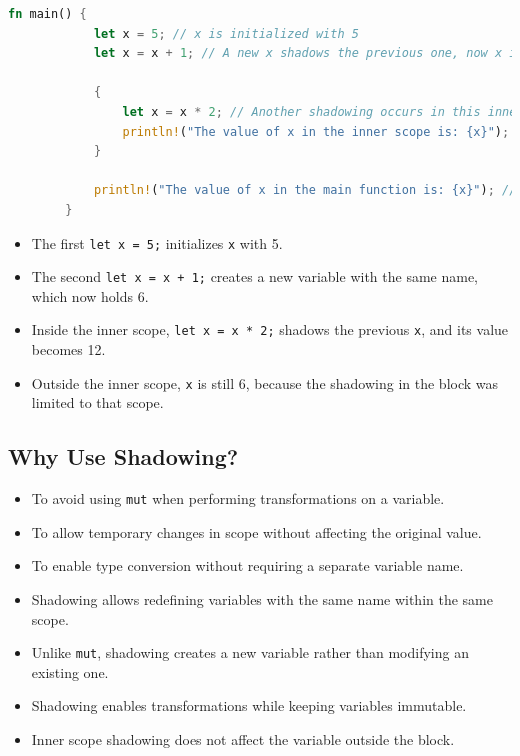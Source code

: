 \documentclass[a4paper,12pt]{report}
\begin{document}
	\begin{lstlisting}[language=Rust]
		fn main() {
			let x = 5; // x is initialized with 5
			let x = x + 1; // A new x shadows the previous one, now x is 6
			
			{
				let x = x * 2; // Another shadowing occurs in this inner scope, x is now 12
				println!("The value of x in the inner scope is: {x}");
			}
			
			println!("The value of x in the main function is: {x}"); // x remains 6
		}
	\end{lstlisting}
	

	\begin{explanationbox}
		\begin{itemize}
			\item The first \texttt{let x = 5;} initializes \texttt{x} with 5.
			\item The second \texttt{let x = x + 1;} creates a new variable with the same name, which now holds 6.
			\item Inside the inner scope, \texttt{let x = x * 2;} shadows the previous \texttt{x}, and its value becomes 12.
			\item Outside the inner scope, \texttt{x} is still 6, because the shadowing in the block was limited to that scope.
		\end{itemize}
	\end{explanationbox}
	
	
	\subsection*{Why Use Shadowing?}
	\begin{itemize}
		\item To avoid using \texttt{mut} when performing transformations on a variable.
		\item To allow temporary changes in scope without affecting the original value.
		\item To enable type conversion without requiring a separate variable name.
	\end{itemize}
	
	\begin{takeawaybox}
		\begin{itemize}
			\item Shadowing allows redefining variables with the same name within the same scope.
			\item Unlike \texttt{mut}, shadowing creates a new variable rather than modifying an existing one.
			\item Shadowing enables transformations while keeping variables immutable.
			\item Inner scope shadowing does not affect the variable outside the block.
		\end{itemize}
	\end{takeawaybox}
	
\end{document}
